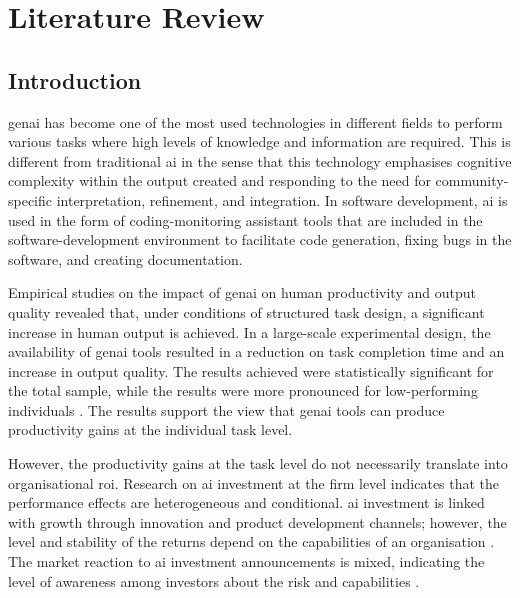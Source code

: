 \chapter{Literature Review} %
\label{cha:ch2_literature} %

\section{Introduction}
\label{sec:Introduction}
\gls{genai} has become one of the most used technologies in different fields to perform various tasks where high levels of knowledge and information are required. This is different from traditional \gls{ai} in the sense that this technology emphasises cognitive complexity within the output created and responding to the need for community-specific interpretation, refinement, and integration. In software development, \gls{ai} is used in the form of coding-monitoring assistant tools that are included in the software-development environment to facilitate code generation, fixing bugs in the software, and creating documentation.

Empirical studies on the impact of \gls{genai} on human productivity and output quality revealed that, under conditions of structured task design, a significant increase in human output is achieved. In a large-scale experimental design, the availability of \gls{genai} tools resulted in a reduction on task completion time and an increase in output quality. The results achieved were statistically significant for the total sample, while the results were more pronounced for low-performing individuals \autocite{Noy2023}. The results support the view that \gls{genai} tools can produce productivity gains at the individual task level.

However, the productivity gains at the task level do not necessarily translate into organisational \gls{roi}. Research on \gls{ai} investment at the firm level indicates that the performance effects are heterogeneous and conditional. \gls{ai} investment is linked with growth through innovation and product development channels; however, the level and stability of the returns depend on the capabilities of an organisation \autocite{Babina2024}. The market reaction to \gls{ai} investment announcements is mixed, indicating the level of awareness among investors about the risk and capabilities \autocite{Lui2021}.

